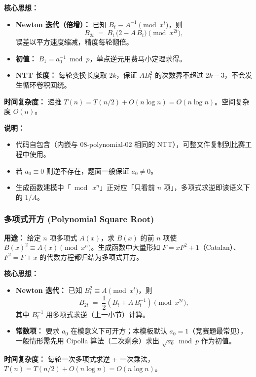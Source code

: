 \textbf{核心思想：}
\begin{itemize}
    \item \textbf{Newton 迭代（倍增）：} 已知 $B_t \equiv A^{-1} \pmod{x^t}$，则
    \[ B_{2t} \;=\; B_t\,\bigl(2 - A\,B_t\bigr) \pmod{x^{2t}}, \]
    误差以平方速度缩减，精度每轮翻倍。
    \item \textbf{初值：} $B_1 = a_0^{-1} \bmod p$，单点逆元用费马小定理求得。
    \item \textbf{NTT 长度：} 每轮变换长度取 $2k$，保证 $A B_t^2$ 的次数界不超过 $2k-3$，不会发生循环卷积回绕。
\end{itemize}

\textbf{时间复杂度：} 递推 $T(n)=T(n/2)+O(n\log n)=O(n\log n)$。空间复杂度 $O(n)$。



\textbf{说明：}
\begin{itemize}
    \item 代码自包含（内嵌与 08-polynomial-02 相同的 NTT），可整文件复制到比赛工程中使用。
    \item 若 $a_0 \equiv 0$ 则逆不存在，题面一般保证 $a_0 \ne 0$。
    \item 生成函数建模中「$\bmod\ x^n$」正对应「只看前 $n$ 项」，多项式求逆即该语义下的 $1/A$。
\end{itemize}

\subsubsection{多项式开方 (Polynomial Square Root)}

\textbf{用途：}
给定 $n$ 项多项式 $A(x)$，求 $B(x)$ 的前 $n$ 项使 $B(x)^2 \equiv A(x) \pmod{x^n}$。生成函数中大量形如 $F=xF^2+1$（Catalan）、$F^2=F+x$ 的代数方程都归结为多项式开方。

\textbf{核心思想：}
\begin{itemize}
    \item \textbf{Newton 迭代：} 已知 $B_t^2 \equiv A \pmod{x^t}$，则
    \[ B_{2t} \;=\; \frac{1}{2}\left(B_t + A\,B_t^{-1}\right) \pmod{x^{2t}}, \]
    其中 $B_t^{-1}$ 用多项式求逆（上一小节）计算。
    \item \textbf{常数项：} 要求 $a_0$ 在模意义下可开方；本模板默认 $a_0=1$（竞赛题最常见），一般情形需先用 Cipolla 算法（二次剩余）求出 $\sqrt{a_0} \bmod p$ 作为初值。
\end{itemize}

\textbf{时间复杂度：} 每轮一次多项式求逆 + 一次乘法，$T(n)=T(n/2)+O(n\log n)=O(n\log n)$。

